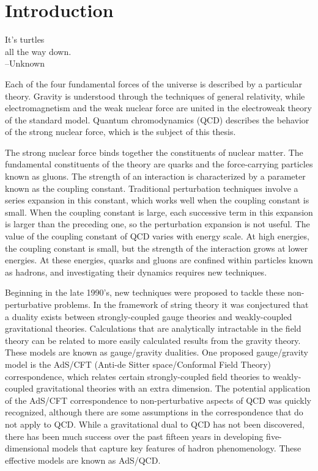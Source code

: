 \chapter{Introduction}
\label{intro_chapter}

\begin{flushright}
It's turtles \\
all the way down. \\
--Unknown
\end{flushright}

Each of the four fundamental forces of the universe is described by a particular theory. 
Gravity is understood through the techniques of general relativity, while electromagnetism and the weak nuclear force are united in the electroweak theory of the standard model.
Quantum chromodynamics (QCD) describes the behavior of the strong nuclear force, which is the subject of this thesis.

The strong nuclear force binds together the constituents of nuclear matter.
The fundamental constituents of the theory are quarks and the force-carrying particles known as gluons.
The strength of an interaction is characterized by a parameter known as the coupling constant. 
Traditional perturbation techniques involve a series expansion in this constant, which works well when the coupling constant is small.
When the coupling constant is large, each successive term in this expansion is larger than the preceding one, so the perturbation expansion is not useful.
The value of the coupling constant of QCD varies with energy scale.
At high energies, the coupling constant is small, but the strength of the interaction grows at lower energies.
At these energies, quarks and gluons are confined within particles known as hadrons, and investigating their dynamics requires new techniques.

Beginning in the late 1990's, new techniques were proposed to tackle these non-perturbative problems.
In the framework of string theory it was conjectured that a duality exists between strongly-coupled gauge theories and weakly-coupled gravitational theories.
Calculations that are analytically intractable in the field theory can be related to more easily calculated results from the gravity theory. 
These models are known as gauge/gravity dualities.
One proposed gauge/gravity model is the AdS/CFT (Anti-de Sitter space/Conformal Field Theory) correspondence, which relates certain strongly-coupled field theories to weakly-coupled gravitational theories with an extra dimension.
The potential application of the AdS/CFT correspondence to non-perturbative aspects of QCD was quickly recognized, although there are some assumptions in the correspondence that do not apply to QCD.
While a gravitational dual to QCD has not been discovered, there has been much success over the past fifteen years in developing five-dimensional models that capture key features of hadron phenomenology.
These effective models are known as AdS/QCD.

